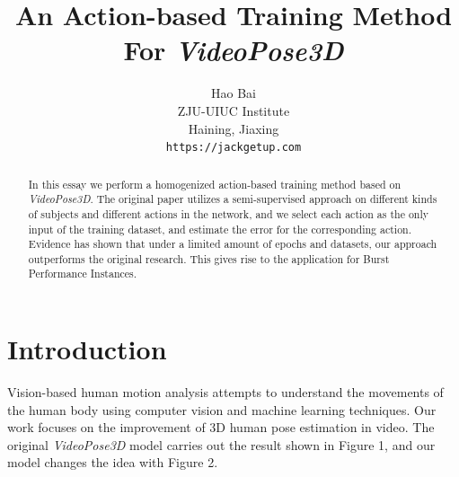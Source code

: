 \documentclass[10pt,twocolumn,letterpaper]{article}
\begin{document}
\title{An Action-based Training Method For \textit{VideoPose3D}}

\author{Hao Bai\\
ZJU-UIUC Institute\\
Haining, Jiaxing\\
{\tt\small https://jackgetup.com}
}

\maketitle

\begin{abstract}
   In this essay we perform a homogenized action-based training method based on \textit{VideoPose3D}.
   The original paper utilizes a semi-supervised approach on different kinds of subjects
   and different actions in the network, and we select each action as the only input of
   the training dataset, and estimate the error for the corresponding action. Evidence has
   shown that under a limited amount of epochs and datasets, our approach outperforms the original 
   research. This gives rise to the application for Burst Performance Instances.
   

\end{abstract}

\section{Introduction}

Vision-based human motion analysis attempts to understand the movements of the human body 
using computer vision and machine learning techniques. Our work focuses on the improvement 
of 3D human pose estimation in video. The original \textit{VideoPose3D} model carries out the 
result shown in Figure 1, and our model changes the idea with Figure 2.
\end{document}
